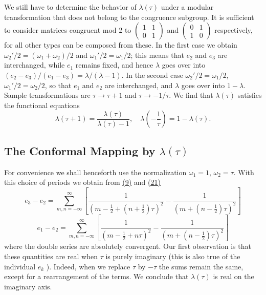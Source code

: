 We still have to determine the behavior of $\lambda(\tau)$ under a modular transformation that does not belong to the congruence subgroup. It is sufficient to consider matrices congruent mod 2 to $\begin{pmatrix}1 & 1 \\ 0 & 1\end{pmatrix}$ and $\begin{pmatrix}0 & 1 \\ 1 & 0\end{pmatrix}$ respectively, for all other types can be composed from these. In the first
case we obtain $\omega_2'/2 = (\omega_1 + \omega_2)/2$ and $\omega_1'/2 = \omega_1/2$; this means that $e_2$ and $e_3$ are interchanged, while $e_1$ remains fixed, and hence $\lambda$ goes over into $(e_2 - e_3)/(e_1 - e_3) = \lambda/(\lambda - 1)$. In the second case $\omega_2'/2 = \omega_1/2$, $\omega_1'/2 = \omega_2/2$, so that $e_1$ and $e_2$ are interchanged, and $\lambda$ goes over into $1 - \lambda$. Sample transformations are $\tau \to \tau + 1$ and $\tau \to -1/\tau$. We find that $\lambda(\tau)$ satisfies the functional equations
\begin{equation*}
\lambda (\tau + 1) = \frac {\lambda (\tau)}{\lambda (\tau) - 1}, \quad \lambda \left(- \frac {1}{\tau}\right) = 1 - \lambda (\tau).\tag{25}\label{eq:7.25}
\end{equation*}
\setcounter{section}{3}\setcounter{subsection}{4}\subsection{\texorpdfstring{The Conformal Mapping by $\lambda(\tau)$}{The Conformal Mapping by λ(τ)}}\label{sec:7.3.5}
For convenience we shall henceforth use the normalization $\omega_{1}=1$, $\omega_{2}=\tau$. With this choice of periods we obtain from \hyperref[eq:7.9]{(9)} and \hyperref[eq:7.21]{(21)}
\begin{equation*}
e _ {3} - e _ {2} = \sum_ {m, n = - \infty} ^ {\infty} \left[ \frac {1}{(m - \frac {1}{2} + (n + \frac {1}{2}) \tau) ^ {2}} - \frac {1}{(m + (n - \frac {1}{2}) \tau) ^ {2}} \right]\tag{26}\label{eq:7.26}
\end{equation*}
\begin{equation*}
e _ {1} - e _ {2} = \sum_ {m, n = - \infty} ^ {\infty} \left[ \frac {1}{(m - \frac {1}{2} + n \tau) ^ {2}} - \frac {1}{(m + (n - \frac {1}{2}) \tau) ^ {2}} \right]
\end{equation*}
where the double series are absolutely convergent. Our first observation is that these quantities are real when $\tau$ is purely imaginary (this is also true of the individual $e_{k}$ ). Indeed, when we replace $\tau$ by $-\tau$ the sums remain the same, except for a rearrangement of the terms. We conclude that $\lambda(\tau)$ is real on the imaginary axis.

